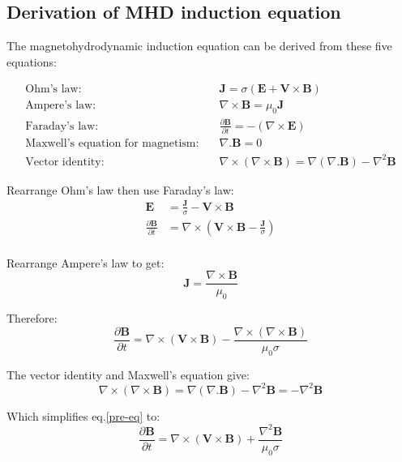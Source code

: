 \documentclass[12pt]{article}
\begin{document}
\begin{appendices}
\section{Derivation of MHD induction equation \label{app:mhd}}
The magnetohydrodynamic induction equation can be derived from these five equations:

\begin{align}
    \text{Ohm's law:} &\quad \textbf{J}=\sigma(\textbf{E}+\textbf{V}\times\textbf{B}) \\
    \text{Ampere's law:} &\quad \nabla\times\textbf{B}=\mu_0\textbf{J} \\
    \text{Faraday's law:} &\quad \frac{\partial\textbf{B}}{\partial t}=-(\nabla\times\textbf{E}) \\
    \text{Maxwell's equation for magnetism:} &\quad \nabla . \textbf{B}=0 \\
    \text{Vector identity:} &\quad \nabla\times(\nabla\times\textbf{B})=\nabla(\nabla . \textbf{B})-\nabla^2\textbf{B}
\end{align}

\noindent Rearrange  Ohm's law then use Faraday's law:
\begin{align}
    \textbf{E} &= \frac{\textbf{J}}{\sigma}-\textbf{V}\times\textbf{B} \\
    \frac{\partial\textbf{B}}{\partial t} &= \nabla\times\left(\textbf{V}\times\textbf{B}-\frac{\textbf{J}}{\sigma}\right) \\
\end{align}

\noindent Rearrange Ampere's law to get:
\begin{equation}
    \textbf{J}=\frac{\nabla\times\textbf{B}}{\mu_0}
\end{equation}

\noindent Therefore:
\begin{equation}
    \frac{\partial\textbf{B}}{\partial t} = \nabla\times(\textbf{V}\times\textbf{B})-\frac{\nabla\times(\nabla\times\textbf{B})}{\mu_0\sigma}
    \label{pre-eq}
\end{equation}

\noindent The vector identity and Maxwell's equation give:
\begin{equation}
    \nabla\times(\nabla\times\textbf{B})=\nabla(\nabla . \textbf{B})-\nabla^2\textbf{B}=-\nabla^2\textbf{B}
\end{equation}

Which simplifies eq.\ref{pre-eq} to:
\begin{equation}
    \frac{\partial\textbf{B}}{\partial t}=\nabla\times(\textbf{V}\times\textbf{B})+\frac{\nabla^2\textbf{B}}{\mu_0\sigma}
\end{equation}

\end{appendices}

\end{document}
